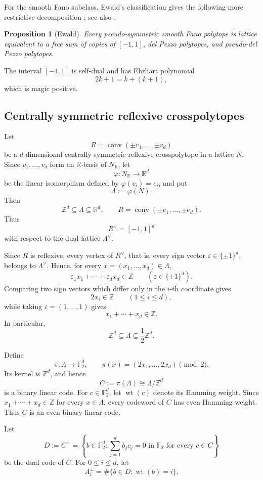 \documentclass[12pt]{amsart}
\newtheorem{Proposition}[Theorem]{Proposition}
\theoremstyle{definition}
\newcommand{\ZZ}{\mathbb Z}
\newcommand{\RR}{\mathbb R}
\newcommand{\conv}{\operatorname{conv}}
\begin{document}
For the smooth Fano subclass, Ewald's classification gives the following
more restrictive decomposition \cite{Ewald,EwaldBook};
see also \cite[Theorem~IV.2.1]{HaaseThesis}.

\begin{Proposition}[Ewald]\label{prop:smooth-classification}
Every pseudo-symmetric smooth Fano polytope is lattice equivalent to a
free sum of copies of $[-1,1]$, del Pezzo polytopes, and pseudo-del Pezzo
polytopes.
\end{Proposition}


The interval $[-1,1]$ is self-dual and has Ehrhart polynomial
\[
2k+1=k+(k+1),
\]
which is magic positive.


\subsection{Centrally symmetric reflexive crosspolytopes}
\label{sec:crosspolytope}
Let
\[
R=\conv(\pm v_1,\ldots,\pm v_d)
\]
be a $d$-dimensional centrally symmetric reflexive crosspolytope
in a lattice $N$.  Since $v_1,\ldots,v_d$ form an $\RR$-basis of
$N_{\RR}$, let
\[
\varphi:N_{\RR}\longrightarrow\RR^d
\]
be the linear isomorphism defined by $\varphi(v_i)=e_i$, and put
\[
\Lambda:=\varphi(N).
\]
Then
\[
\ZZ^d\subseteq\Lambda\subseteq\RR^d,
\qquad
R=\conv(\pm e_1,\ldots,\pm e_d).
\]
Thus
\[
R^\vee=[-1,1]^d
\]
with respect to the dual lattice $\Lambda^\vee$.

Since $R$ is reflexive, every vertex of $R^\vee$, that is, every
sign vector $\varepsilon\in\{\pm1\}^d$, belongs to $\Lambda^\vee$.
Hence, for every $x=(x_1,\ldots,x_d)\in\Lambda$,
\[
\varepsilon_1x_1+\cdots+\varepsilon_dx_d\in\ZZ
\qquad
(\varepsilon\in\{\pm1\}^d).
\]
Comparing two sign vectors which differ only in the $i$-th coordinate
gives
\[
2x_i\in\ZZ
\qquad(1\le i\le d),
\]
while taking $\varepsilon=(1,\ldots,1)$ gives
\[
x_1+\cdots+x_d\in\ZZ.
\]
In particular,
\[
\ZZ^d\subseteq\Lambda\subseteq\frac12\ZZ^d.
\]

Define
\[
\pi:\Lambda\longrightarrow\mathbb F_2^d,
\qquad
\pi(x)
=
(2x_1,\ldots,2x_d)\pmod2.
\]
Its kernel is $\ZZ^d$, and hence
\[
C:=\pi(\Lambda)\cong\Lambda/\ZZ^d
\]
is a binary linear code.
For $c\in\mathbb F_2^d$, let $\operatorname{wt}(c)$ denote its
Hamming weight.
Since $x_1+\cdots+x_d\in\ZZ$ for every $x\in\Lambda$,
every codeword of $C$ has even Hamming weight.
Thus $C$ is an even binary linear code.

Let
\[
D:=C^\perp
=
\left\{
b\in\mathbb F_2^d:
\sum_{j=1}^d b_jc_j=0 \text{ in }\mathbb F_2
\text{ for every }c\in C
\right\}
\]
be the dual code of $C$.
For $0\le i\le d$, let
\[
A_i^\perp
=
\#\{b\in D:\operatorname{wt}(b)=i\}.
\]
\end{document}
